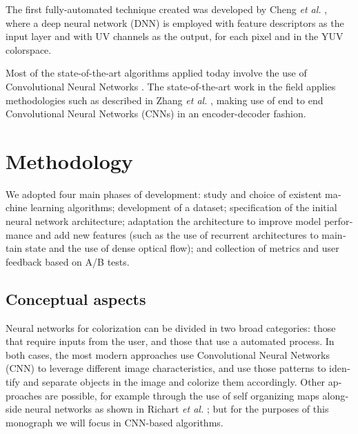 \documentclass[12pt,openright,oneside,a4paper,english]{abntex2}
\begin{document}
\begin{otherlanguage}{english}
The first fully-automated technique created was developed by Cheng \textit{et al.} \cite{Cheng2015},
where a deep neural network (DNN) is employed with feature descriptors as the input layer and with UV channels as the output, for each pixel and in the YUV colorspace.

Most of the state-of-the-art algorithms applied today involve the use of Convolutional Neural Networks \cite{Larsson2016} \cite{Iizuka2016}. The state-of-the-art work in the field applies methodologies such as described in Zhang \textit{et al.} \cite{colorful}, making use of end to end Convolutional Neural Networks (CNNs) in an encoder-decoder fashion.






\chapter{Methodology}

We adopted four main phases of development: study and choice of existent machine learning algorithms; development of a dataset; specification of the initial neural network architecture; adaptation the architecture to improve model performance and add new features (such as the use of recurrent architectures to maintain state and the use of dense optical flow); and collection of metrics and user feedback based on A/B tests.

\section{Conceptual aspects} \label{sec:Concept}
Neural networks for colorization can be divided in two broad categories: those that require inputs from the user, and those that use a automated process. In both cases, the most modern approaches use Convolutional Neural Networks (CNN) to leverage different image characteristics, and use those patterns to identify and separate objects in the image and colorize them accordingly. Other approaches are possible, for example through the use of self organizing maps alongside neural networks as shown in Richart \textit{et al.} \cite{Richart_som_nn}; but for the purposes of this monograph we will focus in CNN-based algorithms.


\end{otherlanguage}
\end{document}

